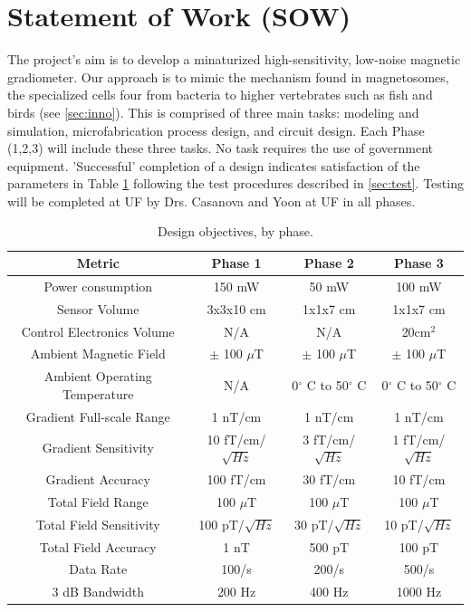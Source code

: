 

\section{Statement of Work (SOW)}
The project's aim is to develop a minaturized high-sensitivity, low-noise magnetic gradiometer. Our approach is to mimic the mechanism found in magnetosomes, the specialized cells four from bacteria to higher vertebrates such as fish and birds (see \ref{sec:inno}). This is comprised of three main tasks: modeling and simulation, microfabrication process design, and circuit design. Each Phase (1,2,3) will include these three tasks. No task requires the use of government equipment. 'Successful' completion of a design indicates satisfaction of the parameters in Table \ref{table:obj} following the test procedures described in \ref{sec:test}. Testing will be completed at UF by Drs. Casanova and Yoon at UF in all phases.

\begin{table}[h!]
\centering
  \begin{tabular}{|c||c|c|c|}
    \hline
    Metric & Phase 1 & Phase 2 & Phase 3 \\
    \hline
    \hline
    Power consumption & 150 mW & 50 mW & 100 mW \\
    \hline
    Sensor Volume & 3x3x10 cm & 1x1x7 cm & 1x1x7 cm \\
    \hline
    Control Electronics Volume  & N/A & N/A & 20cm$^2$ \\
    \hline
    Ambient Magnetic Field & $\pm$ 100 $\mu$T & $\pm$ 100 $\mu$T & $\pm$ 100 $\mu$T \\
    \hline
    Ambient Operating Temperature & N/A & 0$^{\circ}$ C to 50$^{\circ}$ C & 0$^{\circ}$ C to 50$^{\circ}$ C \\
    \hline
    Gradient Full-scale Range & 1 nT/cm & 1 nT/cm & 1 nT/cm \\
    \hline
    Gradient Sensitivity & 10 fT/cm/$\sqrt{Hz}$ & 3 fT/cm/$\sqrt{Hz}$  & 1 fT/cm/$\sqrt{Hz}$ \\
    \hline
    Gradient Accuracy & 100 fT/cm & 30 fT/cm & 10 fT/cm \\
    \hline
    Total Field Range & 100 $\mu$T & 100 $\mu$T & 100 $\mu$T \\
    \hline
    Total Field Sensitivity & 100 pT/$\sqrt{Hz}$ & 30 pT/$\sqrt{Hz}$  &  10 pT/$\sqrt{Hz}$ \\
    \hline
    Total Field Accuracy & 1 nT & 500 pT & 100 pT \\
    \hline
    Data Rate & 100/s & 200/s & 500/s \\
    \hline
    3 dB Bandwidth & 200 Hz & 400 Hz & 1000 Hz\\
    \hline
  \end{tabular}
\caption{Design objectives, by phase.}
\label{table:obj}
\end{table}

